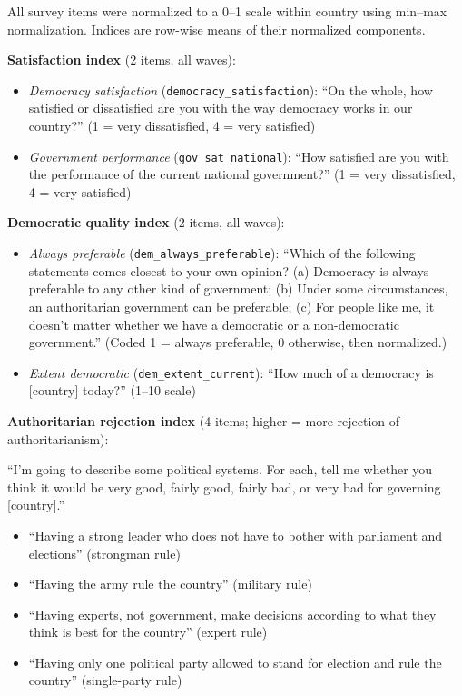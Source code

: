 \documentclass[
  12pt,
  letterpaper]{article}
\providecommand{\tightlist}{%
  \setlength{\itemsep}{0pt}\setlength{\parskip}{0pt}}
\begin{document}
All survey items were normalized to a 0--1 scale within country using
min--max normalization. Indices are row-wise means of their normalized
components.

\textbf{Satisfaction index} (2 items, all waves):

\begin{itemize}
\tightlist
\item
  \emph{Democracy satisfaction} (\texttt{democracy\_satisfaction}): ``On
  the whole, how satisfied or dissatisfied are you with the way
  democracy works in our country?'' (1 = very dissatisfied, 4 = very
  satisfied)
\item
  \emph{Government performance} (\texttt{gov\_sat\_national}): ``How
  satisfied are you with the performance of the current national
  government?'' (1 = very dissatisfied, 4 = very satisfied)
\end{itemize}

\textbf{Democratic quality index} (2 items, all waves):

\begin{itemize}
\tightlist
\item
  \emph{Always preferable} (\texttt{dem\_always\_preferable}): ``Which
  of the following statements comes closest to your own opinion? (a)
  Democracy is always preferable to any other kind of government; (b)
  Under some circumstances, an authoritarian government can be
  preferable; (c) For people like me, it doesn't matter whether we have
  a democratic or a non-democratic government.'' (Coded 1 = always
  preferable, 0 otherwise, then normalized.)
\item
  \emph{Extent democratic} (\texttt{dem\_extent\_current}): ``How much
  of a democracy is {[}country{]} today?'' (1--10 scale)
\end{itemize}

\textbf{Authoritarian rejection index} (4 items; higher = more rejection
of authoritarianism):

``I'm going to describe some political systems. For each, tell me
whether you think it would be very good, fairly good, fairly bad, or
very bad for governing {[}country{]}.''

\begin{itemize}
\tightlist
\item
  ``Having a strong leader who does not have to bother with parliament
  and elections'' (strongman rule)
\item
  ``Having the army rule the country'' (military rule)
\item
  ``Having experts, not government, make decisions according to what
  they think is best for the country'' (expert rule)
\item
  ``Having only one political party allowed to stand for election and
  rule the country'' (single-party rule)
\end{itemize}
\end{document}
